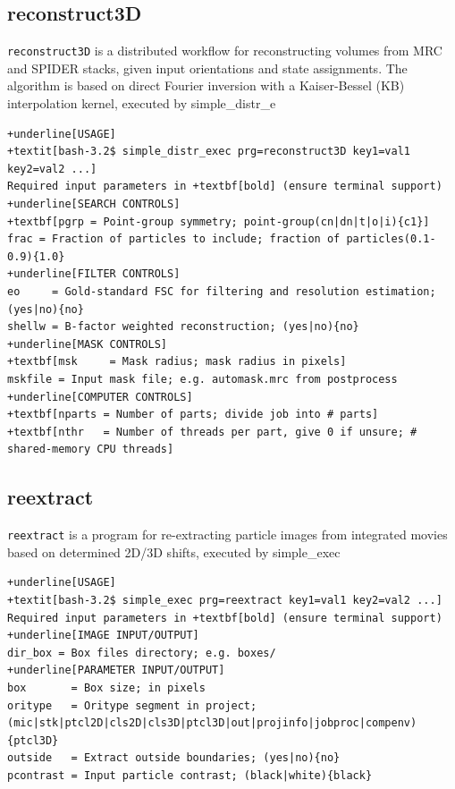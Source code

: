 \documentclass[a4paper,11pt]{article}
\newcommand{\prgname}[1]{\textcolor{NavyBlue}{\texttt{#1}}}
\begin{document}
\subsection{reconstruct3D}
\label{reconstruct3D}
\prgname{reconstruct3D} is a distributed workflow for reconstructing volumes from MRC and SPIDER stacks, given input orientations and state assignments. The algorithm is based on direct Fourier inversion with a Kaiser-Bessel (KB) interpolation kernel, executed by simple\_distr\_e
\begin{Verbatim}[commandchars=+\[\],fontsize=\small,breaklines=true]
+underline[USAGE]
+textit[bash-3.2$ simple_distr_exec prg=reconstruct3D key1=val1 key2=val2 ...]
Required input parameters in +textbf[bold] (ensure terminal support)
+underline[SEARCH CONTROLS]
+textbf[pgrp = Point-group symmetry; point-group(cn|dn|t|o|i){c1}]
frac = Fraction of particles to include; fraction of particles(0.1-0.9){1.0}
+underline[FILTER CONTROLS]
eo     = Gold-standard FSC for filtering and resolution estimation; (yes|no){no}
shellw = B-factor weighted reconstruction; (yes|no){no}
+underline[MASK CONTROLS]
+textbf[msk     = Mask radius; mask radius in pixels]
mskfile = Input mask file; e.g. automask.mrc from postprocess
+underline[COMPUTER CONTROLS]
+textbf[nparts = Number of parts; divide job into # parts]
+textbf[nthr   = Number of threads per part, give 0 if unsure; # shared-memory CPU threads]
\end{Verbatim}

\subsection{reextract}
\label{reextract}
\prgname{reextract} is a program for re-extracting particle images from integrated movies based on determined 2D/3D shifts, executed by simple\_exec
\begin{Verbatim}[commandchars=+\[\],fontsize=\small,breaklines=true]
+underline[USAGE]
+textit[bash-3.2$ simple_exec prg=reextract key1=val1 key2=val2 ...]
Required input parameters in +textbf[bold] (ensure terminal support)
+underline[IMAGE INPUT/OUTPUT]
dir_box = Box files directory; e.g. boxes/
+underline[PARAMETER INPUT/OUTPUT]
box       = Box size; in pixels
oritype   = Oritype segment in project; (mic|stk|ptcl2D|cls2D|cls3D|ptcl3D|out|projinfo|jobproc|compenv){ptcl3D}
outside   = Extract outside boundaries; (yes|no){no}
pcontrast = Input particle contrast; (black|white){black}
\end{Verbatim}
\end{document}
